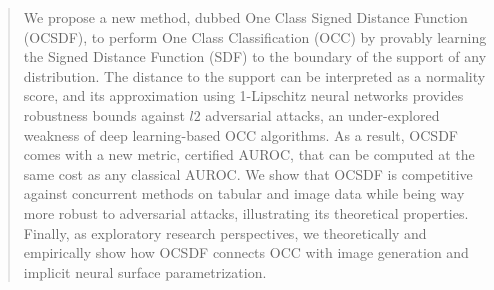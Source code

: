 \begin{abstract}
    We propose a new method, dubbed One Class Signed Distance Function (OCSDF), to perform One Class Classification (OCC) by provably learning the Signed Distance Function (SDF) to the boundary of the support of any distribution. The distance to the support can be interpreted as a normality score, and its approximation using 1-Lipschitz neural networks provides robustness bounds against $l2$ adversarial attacks, an under-explored weakness of deep learning-based OCC algorithms. As a result, OCSDF comes with a new metric, certified AUROC, that can be computed at the same cost as any classical AUROC. We show that OCSDF is competitive against concurrent methods on tabular and image data while being way more robust to adversarial attacks, illustrating its theoretical properties. Finally, as exploratory research perspectives, we theoretically and empirically show how OCSDF connects OCC with image generation and implicit neural surface parametrization.
\end{abstract}





